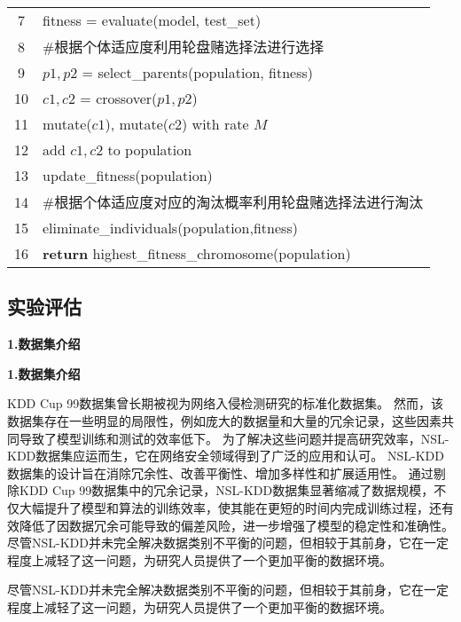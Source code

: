 \begin{table}[h]
\begin{table}[h]
\begin{table}[h]
\begin{tabularx}{1.0\textwidth}{cl}
		7  & \quad\quad fitness = evaluate(model, test\_set)                                \\
		8  & \quad \#根据个体适应度利用轮盘赌选择法进行选择                                 \\
		9  & \quad $p1, p2$ = select\_parents(population, fitness)                          \\
		10 & \quad $c1, c2$ = crossover($p1, p2$)                                           \\
		11 & \quad mutate($c1$), mutate($c2$) with rate $M$                                 \\
		12 & \quad add $c1, c2$ to population                                               \\
		13 & \quad update\_fitness(population)                                              \\
		14 & \quad \#根据个体适应度对应的淘汰概率利用轮盘赌选择法进行淘汰                   \\
		15 & \quad eliminate\_individuals(population,fitness)                               \\
		16 & \textbf{return} highest\_fitness\_chromosome(population)                       \\
		\bottomrule
	\end{tabularx}
\end{table}


\subsection{实验评估}
\textbf{1.数据集介绍}\par
\textbf{1.数据集介绍}\par
KDD Cup 99数据集\cite{tavallaee2009detailed}曾长期被视为网络入侵检测研究的标准化数据集。
然而，该数据集存在一些明显的局限性，例如庞大的数据量和大量的冗余记录，这些因素共同导致了模型训练和测试的效率低下。
为了解决这些问题并提高研究效率，NSL-KDD数据集\cite{revathi2013detailed}应运而生，它在网络安全领域得到了广泛的应用和认可。
NSL-KDD数据集的设计旨在消除冗余性、改善平衡性、增加多样性和扩展适用性。
通过剔除KDD Cup 99数据集中的冗余记录，NSL-KDD数据集显著缩减了数据规模，不仅大幅提升了模型和算法的训练效率，使其能在更短的时间内完成训练过程，还有效降低了因数据冗余可能导致的偏差风险，进一步增强了模型的稳定性和准确性。
尽管NSL-KDD并未完全解决数据类别不平衡的问题，但相较于其前身，它在一定程度上减轻了这一问题，为研究人员提供了一个更加平衡的数据环境。\par
尽管NSL-KDD并未完全解决数据类别不平衡的问题，但相较于其前身，它在一定程度上减轻了这一问题，为研究人员提供了一个更加平衡的数据环境。\par


\end{table}
\end{table}
